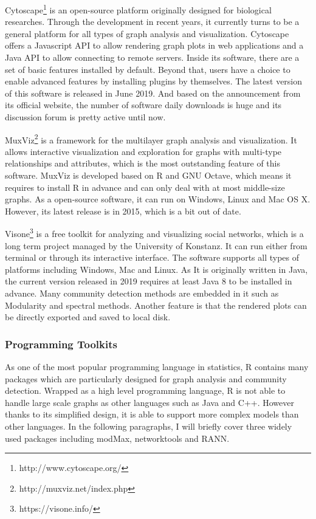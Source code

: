 Cytoscape\footnote{http://www.cytoscape.org/} is an open-source platform originally designed for biological researches. Through the development in recent years, it currently turns to be a general platform for all types of graph analysis and visualization. Cytoscape offers a Javascript API to allow rendering graph plots in web applications and a Java API to allow connecting to remote servers.  Inside its software, there are a set of basic features installed by default. Beyond that, users have a choice to enable advanced features by installing plugins by themselves. The latest version of this software is released in June 2019. And based on the announcement from its official website, the number of software daily downloads is huge and its discussion forum is pretty active until now.

MuxViz\footnote{http://muxviz.net/index.php} is a framework for the multilayer graph analysis and visualization. It allows interactive visualization and exploration  for graphs with multi-type relationships and attributes, which is the most outstanding feature of this software. MuxViz is developed based on R and GNU Octave, which means it requires to install R in advance and can only deal with at most middle-size graphs. As a open-source software, it can run on Windows, Linux and Mac OS X. However, its latest release is in 2015, which is a bit out of date. 

Visone\footnote{https://visone.info/} is a free toolkit for analyzing and visualizing social networks, which is a long term project managed by the University of Konstanz. It can run either from terminal or through its interactive interface. The software supports all types of platforms including Windows, Mac and Linux. As It is originally written in Java, the current version released in 2019 requires at least Java 8 to be installed in advance. Many community detection methods are embedded in it such as Modularity and spectral methods. Another feature is that the rendered plots can be directly exported and saved to local disk. 

\subsubsection{Programming Toolkits}

As one of the most popular programming language in statistics, R contains many packages which are particularly designed for graph analysis and community detection. Wrapped as a high level programming language, R is not able to handle large scale graphs as other languages such as Java and C++. However thanks to its simplified design, it is able to support more complex models than other languages. In the following paragraphs, I will briefly cover three widely used packages including modMax, networktools and RANN.

